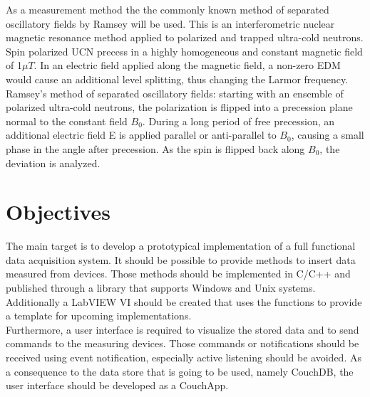As a measurement method the the commonly known method of separated oscillatory fields by Ramsey will be used. This is an interferometric nuclear magnetic resonance method applied to polarized and trapped ultra-cold neutrons. Spin polarized UCN precess in a highly homogeneous and constant magnetic field of 1$\mu T$. In an electric field applied along the magnetic field, a non-zero EDM would cause an additional level splitting, thus changing the Larmor frequency.\\


Ramsey's method of separated oscillatory fields: starting with an ensemble of polarized ultra-cold neutrons, the polarization is flipped into a precession plane normal to the constant field $B_{0}$. During a long period of free precession, an additional electric field E is applied parallel or anti-parallel to $B_{0}$, causing a small phase in the angle after precession. As the spin is flipped back along $B_{0}$, the deviation is analyzed. 

\section{Objectives}
The main target is to develop a prototypical implementation of a full functional data acquisition system. It should be possible to provide methods to insert data measured from devices. Those methods should be implemented in C/C++ and published through a library that supports Windows and Unix systems. Additionally a LabVIEW VI should be created that uses the functions to provide a template for upcoming implementations.\\
Furthermore, a user interface is required to visualize the stored data and to send commands to the measuring devices. Those commands or notifications should be received using event notification, especially active listening should be avoided. As a consequence to the data store that is going to be used, namely CouchDB, the user interface should be developed as a CouchApp. 
